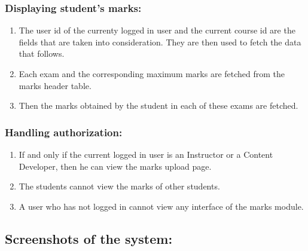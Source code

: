 \subsubsection*{Displaying student's marks:}
\begin{enumerate}
	\item The user id of the currenty logged in user and the current course id are the fields that are taken into consideration. They are then used to fetch the data that follows.
	\item Each exam and the corresponding maximum marks are fetched from the marks header table.
	\item Then the marks obtained by the student in each of these exams are fetched.
\end{enumerate}

\subsubsection*{Handling authorization:}
\begin{enumerate}
	\item If and only if the current logged in user is an Instructor or a Content Developer, then he can view the marks upload page.
	\item The students cannot view the marks of other students.
	\item A user who has not logged in cannot view any interface of the marks module.
\end{enumerate}

\newpage

\subsection*{Screenshots of the system:}


